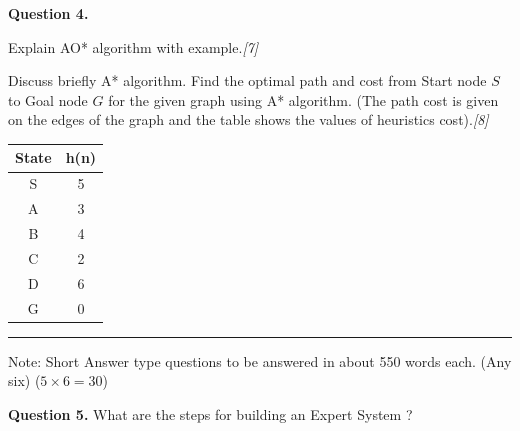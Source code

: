 \documentclass[11pt,a4paper]{article}
\newcommand{\pts}[1]{\hfill\textit{[#1]}}
\begin{document}
\medskip\noindent\textbf{Question 4.}
\begin{parts}
  \item Explain AO* algorithm with example.\pts{7}
  \item Discuss briefly A* algorithm. Find the optimal path and cost from Start node $S$ to Goal node $G$ for the given graph using A* algorithm. (The path cost is given on the edges of the graph and the table shows the values of heuristics cost).\pts{8}
  
  \begin{center}
  \end{center}
  
  \begin{center}
  \begin{tabular}{|c|c|}
    \hline
    \textbf{State} & \textbf{h(n)} \\
    \hline
    S & 5 \\
    \hline
    A & 3 \\
    \hline
    B & 4 \\
    \hline
    C & 2 \\
    \hline
    D & 6 \\
    \hline
    G & 0 \\
    \hline
  \end{tabular}
  \end{center}
\end{parts}

\bigskip{}
\rule{\linewidth}{0.4pt}\smallskip

Note: Short Answer type questions to be answered in
about 550 words each. (Any six) ($5 \times 6 = 30$)

\medskip\noindent\textbf{Question 5.} What are the steps for building an Expert System ?
\end{document}
